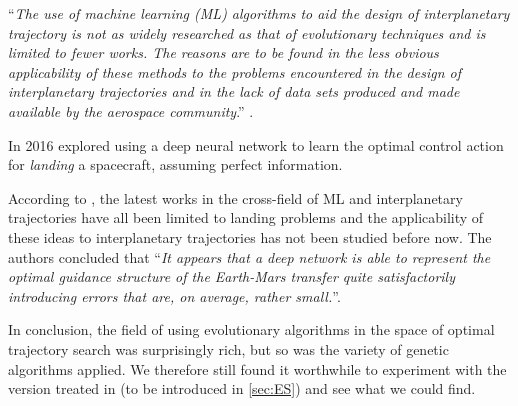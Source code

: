 ``\textit{The use of machine learning (ML) algorithms to aid the design of interplanetary trajectory is not as widely researched as that of evolutionary techniques and is limited to fewer works. The reasons are to be found in the less obvious applicability of these methods to the problems encountered in the design of interplanetary trajectories and in the lack of data sets produced and made available by the aerospace community}.'' \cite{Izzo2018}.

In 2016 \cite{Sanchez-Sanchez2016} explored using a deep neural network to learn the optimal control action for \emph{landing} a spacecraft, assuming perfect information. 

According to \cite{Izzo2018}, the latest works in the cross-field of ML and interplanetary trajectories have all been limited to landing problems and the applicability of these ideas to interplanetary trajectories has not been studied before now. The authors concluded that ``\textit{It appears that a deep network is able to represent the optimal guidance structure of the Earth-Mars transfer quite satisfactorily introducing errors that are, on average, rather small.}''.

In conclusion, the field of using evolutionary algorithms in the space of optimal trajectory search was surprisingly rich, but so was the variety of genetic algorithms applied. We therefore still found it worthwhile to experiment with the version treated in \cite{Salimans2017} (to be introduced in \cref{sec:ES}) and see what we could find.